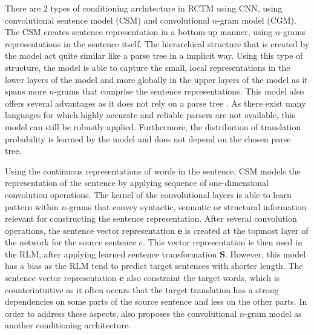\documentclass[12pt]{extarticle}
\begin{document}
There are 2 types of conditioning architecture in RCTM using CNN, using convolutional sentence model (CSM) and convolutional $n$-gram model (CGM). The CSM creates sentence representation in a bottom-up manner, using $n$-grams representations in the sentence itself. The hierarchical structure that is created by the model act quite similar like a parse tree in a implicit way. Using this type of structure, the model is able to capture the small, local representations in the lower layers of the model and more globally in the upper layers of the model as it spans more $n$-grams that comprise the sentence representations. This model also offers several advantages as it does not rely on a parse tree \citep{Grefenstette:2011:CSS:2002669.2002683, Socher:2012:SCT:2390948.2391084}. As there exist many languages for which highly accurate and reliable parsers are not available, this model can still be robustly applied. Furthermore, the distribution of translation probability is learned by the model and does not depend on the chosen parse tree.

Using the continuous representations of words in the sentence, CSM models the representation of the sentence by applying sequence of one-dimensional convolution operations. The kernel of the convolutional layers is able to learn pattern within $n$-grams that convey syntactic, semantic or structural information relevant for constructing the sentence representation. After several convolution operations, the sentence vector representation $\textbf{e}$ is created at the topmost layer of the network for the source sentence $e$. This vector representation is then used in the RLM, after applying learned sentence transformation $\textbf{S}$. However, this model has a bias as the RLM tend to predict target sentences with shorter length. The sentence vector representation $\textbf{e}$ also constraint the target words, which is counterintuitive as it often occurs that the target translation has a strong dependencies on some parts of the source sentence and less on the other parts. In order to address these aspects, \citep{kalchbrenner-blunsom-2013-recurrent-continuous} also proposes the convolutional $n$-gram model as another conditioning architecture.
\end{document}

